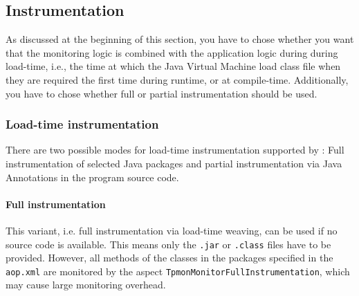 \documentclass[a4paper,12pt]{scrartcl}
\begin{document}
%
%

\subsection{Instrumentation}
As discussed at the beginning of this section, you have to chose
 whether you want that the monitoring logic is combined with the application
 logic during during load-time, i.e., the time at which the Java Virtual Machine
 load class file when they are required the first time during runtime, or at compile-time. Additionally,
you have to chose whether full or partial instrumentation should be used.

%
%
\subsubsection{Load-time instrumentation}
There are two possible modes for load-time instrumentation supported by \tpmon{}:
 Full instrumentation of selected Java packages and partial instrumentation via Java Annotations
in the program source code.
\paragraph{Full instrumentation}
This variant, i.e. full instrumentation via load-time weaving, can be used if no source code is available. This means only the \texttt{.jar} or \texttt{.class} files have to be provided. However, all methods of the classes in the packages specified in the \texttt{aop.xml} are monitored by the aspect \texttt{TpmonMonitorFullInstrumentation}, which may cause large monitoring overhead.
\end{document}
